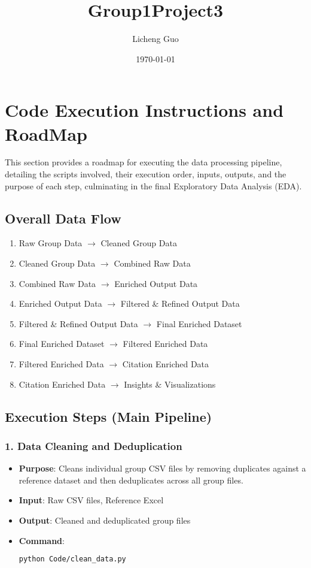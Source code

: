 \documentclass[12pt]{article}
\title{Group1Project3}
\author{Licheng Guo}
\date{\today}
\begin{document}
\maketitle

\tableofcontents

\section{Code Execution Instructions and RoadMap}
This section provides a roadmap for executing the data processing pipeline, detailing the scripts involved, their execution order, inputs, outputs, and the purpose of each step, culminating in the final Exploratory Data Analysis (EDA).

\subsection{Overall Data Flow}
\begin{enumerate}[label=\textbf{Step \arabic*:}]
    \item Raw Group Data $\rightarrow$ Cleaned Group Data
    \item Cleaned Group Data $\rightarrow$ Combined Raw Data
    \item Combined Raw Data $\rightarrow$ Enriched Output Data
    \item Enriched Output Data $\rightarrow$ Filtered \& Refined Output Data
    \item Filtered \& Refined Output Data $\rightarrow$ Final Enriched Dataset
    \item Final Enriched Dataset $\rightarrow$ Filtered Enriched Data
    \item Filtered Enriched Data $\rightarrow$ Citation Enriched Data
    \item Citation Enriched Data $\rightarrow$ Insights \& Visualizations
\end{enumerate}

\subsection{Execution Steps (Main Pipeline)}

\subsubsection{1. Data Cleaning and Deduplication}
\begin{itemize}
    \item \textbf{Purpose}: Cleans individual group CSV files by removing duplicates against a reference dataset and then deduplicates across all group files.
    \item \textbf{Input}: Raw CSV files, Reference Excel
    \item \textbf{Output}: Cleaned and deduplicated group files
    \item \textbf{Command}:
    \begin{lstlisting}[language=bash]
    python Code/clean_data.py
    \end{lstlisting}
\end{itemize}
\end{document}
